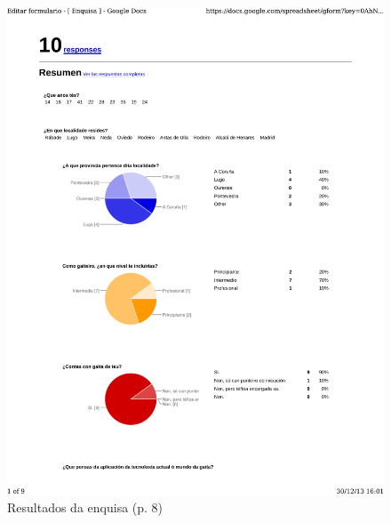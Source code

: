 \begin{figure}
 \centering
 \includegraphics[scale=0.7,page=8,keepaspectratio=true]{./imagenes/enquisa.pdf}
 \caption{Resultados da enquisa (p. 8)}
 \label{figura:ResultadosEnquisa8}
\end{figure}

